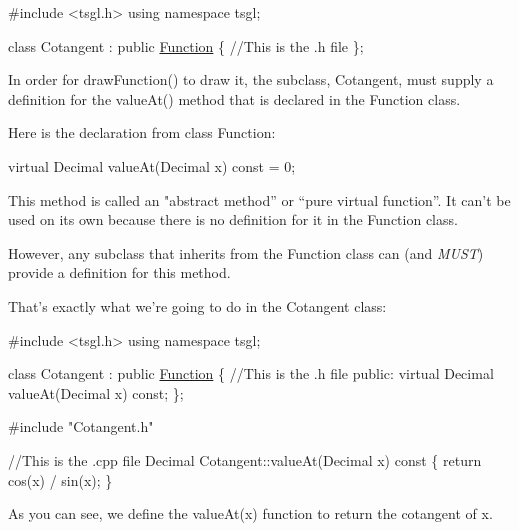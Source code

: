\begin{DoxyCode}
\textcolor{preprocessor}{#include <tsgl.h>}
\textcolor{keyword}{using namespace }tsgl;

\textcolor{keyword}{class }Cotangent : \textcolor{keyword}{public} \hyperlink{classtsgl_1_1_function}{Function} \{ 
\textcolor{comment}{//This is the .h file}
\};
\end{DoxyCode}


In order for {\ttfamily draw\-Function()} to draw it, the subclass, {\ttfamily Cotangent}, must supply a definition for the {\ttfamily value\-At()} method that is declared in the {\ttfamily Function} class.

Here is the declaration from class {\ttfamily Function}\-:


\begin{DoxyCode}
\textcolor{keyword}{virtual} Decimal valueAt(Decimal x) \textcolor{keyword}{const} = 0;
\end{DoxyCode}


This method is called an "abstract method” or “pure virtual function”. It can't be used on its own because there is no definition for it in the {\ttfamily Function} class.

However, any subclass that inherits from the {\ttfamily Function} class can (and {\itshape M\-U\-S\-T}) provide a definition for this method.

That's exactly what we're going to do in the {\ttfamily Cotangent} class\-:


\begin{DoxyCode}
\textcolor{preprocessor}{#include <tsgl.h>}
\textcolor{keyword}{using namespace }tsgl;

\textcolor{keyword}{class }Cotangent : \textcolor{keyword}{public} \hyperlink{classtsgl_1_1_function}{Function} \{
 \textcolor{comment}{//This is the .h file}
 \textcolor{keyword}{public}:
    \textcolor{keyword}{virtual} Decimal valueAt(Decimal x) \textcolor{keyword}{const}; 
\};
\end{DoxyCode}



\begin{DoxyCode}
\textcolor{preprocessor}{#include "Cotangent.h"}

\textcolor{comment}{//This is the .cpp file}
Decimal Cotangent::valueAt(Decimal x)\textcolor{keyword}{ const }\{
    \textcolor{keywordflow}{return} cos(x) / sin(x);
\}
\end{DoxyCode}


As you can see, we define the {\ttfamily value\-At(x)} function to return the cotangent of x.

